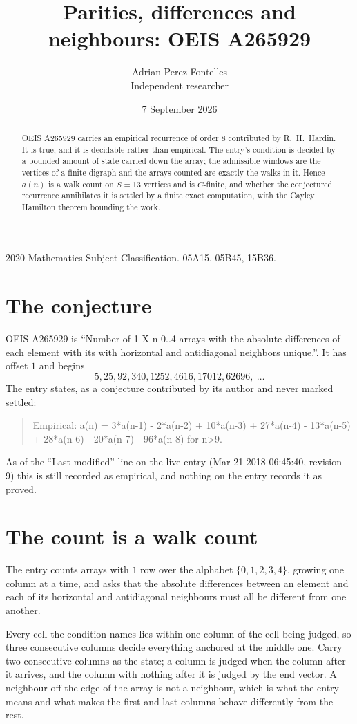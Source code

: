 \documentclass[11pt,a4paper]{article}
\title{Parities, differences and neighbours: OEIS A265929}
\author{Adrian Perez Fontelles\\ \small Independent researcher}
\date{7 September 2026}
\theoremstyle{plain}
\theoremstyle{definition}
\begin{document}
\maketitle

\begin{abstract}
OEIS A265929 carries an empirical recurrence of order $8$ contributed by R.~H.~Hardin. It is
true, and it is decidable rather than empirical. The entry's condition is decided by a bounded amount of state carried down the array; the
admissible windows are the vertices of a finite digraph and the arrays counted are exactly the
walks in it. Hence $a(n)$ is a walk count on $S=13$ vertices and is $C$-finite, and whether the
conjectured recurrence annihilates it is settled by a finite exact computation, with the
Cayley--Hamilton theorem bounding the work.
\end{abstract}

\noindent\small 2020 Mathematics Subject Classification. 05A15, 05B45, 15B36.\normalsize

\section{The conjecture}

OEIS A265929 is ``Number of 1 X n 0..4 arrays with the absolute differences of each element with its with horizontal and antidiagonal neighbors unique.''. It has offset $1$ and begins
\[
5, 25, 92, 340, 1252, 4616, 17012, 62696,\ \dots
\]
The entry states, as a conjecture contributed by its author and never marked settled:
\begin{quote}
Empirical: a(n) = 3*a(n-1) - 2*a(n-2) + 10*a(n-3) + 27*a(n-4) - 13*a(n-5) + 28*a(n-6) - 20*a(n-7) - 96*a(n-8) for n>9.
\end{quote}
As of the ``Last modified'' line on the live entry (Mar 21 2018 06:45:40, revision 9) this is still
recorded as empirical, and nothing on the entry records it as proved.

\section{The count is a walk count}

The entry counts arrays with $1$ row over the alphabet $\{0,1,2,3,4\}$, growing one column at a time, and asks that the absolute differences between an element and each of its horizontal and antidiagonal neighbours must all be different from one another.

Every cell the condition names lies within one column of the cell being judged, so three consecutive columns decide everything anchored at the middle one. Carry two consecutive columns as the state; a column is judged when the column after it arrives, and the column with nothing after it is judged by the end vector. A neighbour off the edge of the array is not a neighbour, which is what the entry means and what makes the first and last columns behave differently from the rest.
\end{document}
